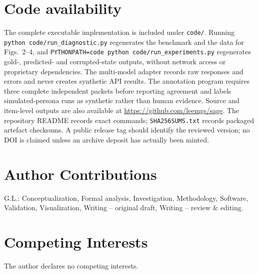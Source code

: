 \documentclass[
    Numbered,         %
]{sn-jnl}
\begin{document}
\section*{Code availability}
The complete executable implementation is included under \texttt{code/}.
Running \texttt{python code/run\_diagnostic.py} regenerates the benchmark
and the data for Figs.~2--4, and
\texttt{PYTHONPATH=code python code/run\_experiments.py} regenerates gold-,
predicted- and corrupted-state outputs, without network access or proprietary
dependencies. The multi-model adapter records raw
responses and errors and never creates synthetic API results. The annotation
program requires three complete independent packets before reporting agreement
and labels simulated-persona runs as synthetic rather than human evidence.
Source and item-level outputs are also available at
\url{https://github.com/leemgs/sage}. The repository README records exact
commands; \texttt{SHA256SUMS.txt} records packaged artefact checksums. A public
release tag should identify the reviewed version; no DOI is claimed unless an
archive deposit has actually been minted.

\section*{Author Contributions}
G.L.: Conceptualization, Formal analysis, Investigation, Methodology,
Software, Validation, Visualization, Writing -- original draft,
Writing -- review \& editing.

\section*{Competing Interests}
The author declares no competing interests.





\clearpage
{}
\end{document}
